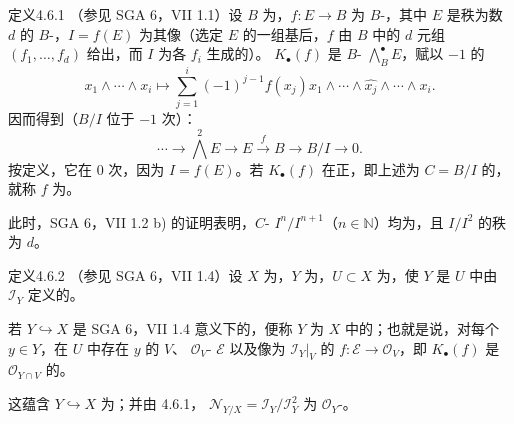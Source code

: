 \begin{SGAresult}{定义}{4.6.1}
（参见 SGA 6，VII 1.1）设 $B$ 为，$f:E\to B$ 为 $B$-，其中 $E$ 是秩为数 $d$ 的 $B$-，$I=f(E)$ 为其像（选定 $E$ 的一组基后，$f$ 由 $B$ 中的 $d$ 元组 $(f_1,\ldots,f_d)$ 给出，而 $I$ 为各 $f_i$ 生成的）。 $K_\bullet(f)$ 是 $B$- $\bigwedge_B^\bullet E$，赋以 $-1$ 的
\[x_1\wedge\cdots\wedge x_i\longmapsto\sum_{j=1}^i(-1)^{j-1}f(x_j)x_1\wedge\cdots\wedge\widehat{x_j}\wedge\cdots\wedge x_i.\]
因而得到（$B/I$ 位于 $-1$ 次）：
\[\cdots\longrightarrow\bigwedge^2 E\longrightarrow E\xrightarrow f B\longrightarrow B/I\longrightarrow0.\]
按定义，它在 $0$ 次，因为 $I=f(E)$。若 $K_\bullet(f)$ 在正，即上述为 $C=B/I$ 的，就称 $f$ 为。

此时，SGA 6，VII 1.2 b) 的证明表明，$C$- $I^n/I^{n+1}$（$n\in\mathbb N$）均为，且 $I/I^2$ 的秩为 $d$。
\end{SGAresult}
\begin{SGAresult}{定义}{4.6.2}
（参见 SGA 6，VII 1.4）设 $X$ 为，$Y$ 为，$U\subset X$ 为，使 $Y$ 是 $U$ 中由 $\mathscr I_Y$ 定义的。

若 $Y\hookrightarrow X$ 是 SGA 6，VII 1.4 意义下的，便称 $Y$ 为 $X$ 中的；也就是说，对每个 $y\in Y$，在 $U$ 中存在 $y$ 的 $V$、 $\mathscr O_V$- $\mathscr E$ 以及像为 $\mathscr I_Y|_V$ 的 $f:\mathscr E\to\mathscr O_V$，即 $K_\bullet(f)$ 是 $\mathscr O_{Y\cap V}$ 的。

这蕴含 $Y\hookrightarrow X$ 为；并由 4.6.1， $\mathscr N_{Y/X}=\mathscr I_Y/\mathscr I_Y^2$ 为 $\mathscr O_Y$-。
\end{SGAresult}
